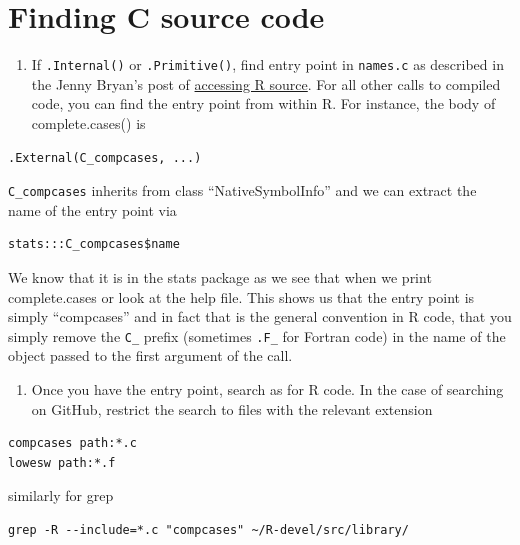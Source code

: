 \documentclass[
]{book}
\providecommand{\tightlist}{%
  \setlength{\itemsep}{0pt}\setlength{\parskip}{0pt}}
\begin{document}
\hypertarget{finding-c-source-code}{%
\section{Finding C source code}\label{finding-c-source-code}}

\begin{enumerate}
\def\labelenumi{\arabic{enumi}.}
\tightlist
\item
  If \texttt{.Internal()} or \texttt{.Primitive()}, find entry point in \texttt{names.c} as described in the Jenny Bryan's post of \href{https://github.com/jennybc/access-r-source}{accessing R source}. For all other calls to compiled code, you can find the entry point from within R. For instance, the body of complete.cases() is
\end{enumerate}

\begin{verbatim}
.External(C_compcases, ...)
\end{verbatim}

\texttt{C\_compcases} inherits from class ``NativeSymbolInfo'' and we can extract the name of the entry point via

\begin{verbatim}
stats:::C_compcases$name
\end{verbatim}

We know that it is in the stats package as we see that when we print complete.cases or look at the help file. This shows us that the entry point is simply ``compcases'' and in fact that is the general convention in R code, that you simply remove the \texttt{C\_} prefix (sometimes \texttt{.F\_} for Fortran code) in the name of the object passed to the first argument of the call.

\begin{enumerate}
\def\labelenumi{\arabic{enumi}.}
\setcounter{enumi}{1}
\tightlist
\item
  Once you have the entry point, search as for R code. In the case of searching on GitHub, restrict the search to files with the relevant extension
\end{enumerate}

\begin{verbatim}
compcases path:*.c
lowesw path:*.f
\end{verbatim}

similarly for grep

\begin{verbatim}
grep -R --include=*.c "compcases" ~/R-devel/src/library/
\end{verbatim}
\end{document}
